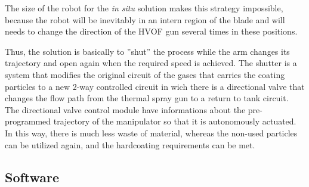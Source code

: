 The size of the robot for the \textit{in situ} solution makes this strategy
impossible, because the robot will be inevitably in an intern region of the blade and will
needs to change the direction of the HVOF gun several times in these
positions. 

Thus, the solution is basically to ''shut'' the process while the arm changes
its trajectory and open again when the required speed is achieved.
The shutter is a system that modifies the original circuit of the gases that
carries the coating particles to a new 2-way controlled circuit in wich there 
is a directional valve that changes the flow path from the thermal spray gun to
a return to tank circuit. 
The directional valve control module have informations about the pre-programmed
trajectory of the manipulator so that it is autonomously actuated.
In this way, there is much less waste of material, whereas the non-used
particles can be utilized again, and the hardcoating requirements can be met.


\subsection{Software}